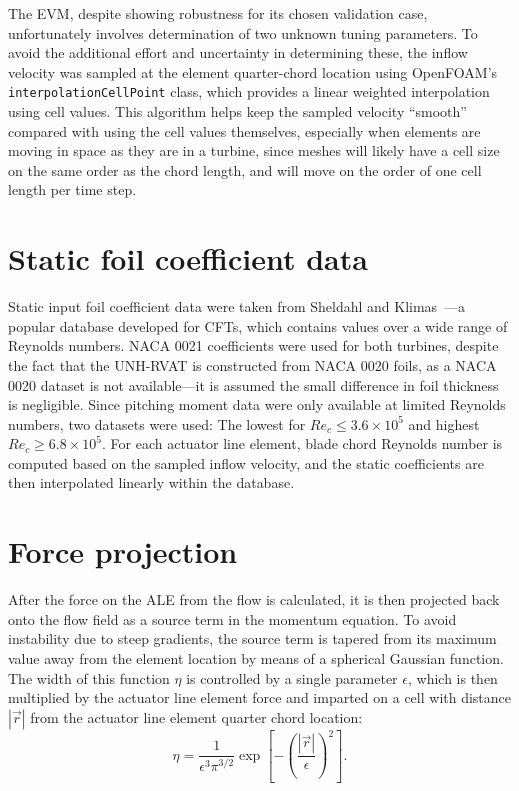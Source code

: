 The EVM, despite showing robustness for its chosen validation case,
unfortunately involves determination of two unknown tuning parameters. To avoid
the additional effort and uncertainty in determining these, the inflow velocity
was sampled at the element quarter-chord location using OpenFOAM's
\texttt{interpolationCellPoint} class, which provides a linear weighted
interpolation using cell values. This algorithm helps keep the sampled velocity
``smooth'' compared with using the cell values themselves, especially when
elements are moving in space as they are in a turbine, since meshes will likely
have a cell size on the same order as the chord length, and will move on the
order of one cell length per time step.


\section{Static foil coefficient data}

Static input foil coefficient data were taken from Sheldahl and
Klimas~\cite{Sheldahl1981}---a popular database developed for CFTs, which
contains values over a wide range of Reynolds numbers. NACA 0021 coefficients
were used for both turbines, despite the fact that the UNH-RVAT is constructed
from NACA 0020 foils, as a NACA 0020 dataset is not available---it is assumed
the small difference in foil thickness is negligible. Since pitching moment data
were only available at limited Reynolds numbers, two datasets were used: The
lowest for $Re_c \leq 3.6 \times 10^5$ and highest $Re_c \geq 6.8 \times 10^5$.
For each actuator line element, blade chord Reynolds number is computed based on
the sampled inflow velocity, and the static coefficients are then interpolated
linearly within the database.


\section{Force projection}

After the force on the ALE from the flow is calculated, it is then projected
back onto the flow field as a source term in the momentum equation. To avoid
instability due to steep gradients, the source term is tapered from its maximum
value away from the element location by means of a spherical Gaussian function.
The width of this function $\eta$ is controlled by a single parameter
$\epsilon$, which is then multiplied by the actuator line element force and
imparted on a cell with distance $| \vec{r} |$ from the actuator line element
quarter chord location:
\begin{equation}
    \eta = \frac{1}{\epsilon^3 \pi^{3/2}} \exp
    \left[ - \left( \frac{| \vec{r} |}{\epsilon} \right)^2 \right].
    \label{eq:projection}
\end{equation}

